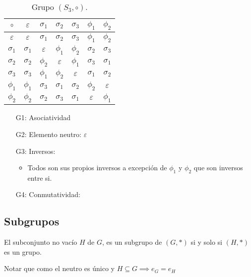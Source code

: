 \begin{table}[H]
	\centering
	\begin{tabular}{c|cccccc}
		$\circ$ & $\varepsilon$ & $\sigma_1$ & $\sigma_2$ & $\sigma_3$ & $\phi_1$ & $\phi_2$ \\ \hline
		$\varepsilon$ & $\varepsilon$ & $\sigma_1$ & $\sigma_2$ & $\sigma_3$ & $\phi_1$ & $\phi_2$ \\
		$\sigma_1$ & $\sigma_1$ & $\varepsilon$ & $\phi_1$ & $\phi_2$ & $\sigma_2$ & $\sigma_3$ \\
		$\sigma_2$ & $\sigma_2$ & $\phi_2$ & $\varepsilon$ & $\phi_1$ & $\sigma_3$ & $\sigma_1$\\
		$\sigma_3$ & $\sigma_3$ & $\phi_1$ & $\phi_2$ & $\varepsilon$ & $\sigma_1$ & $\sigma_2$\\
		$\phi_1$ & $\phi_1$ & $\sigma_3$ & $\sigma_1$ & $\sigma_2$ & $\phi_2$ & $\varepsilon$\\
		$\phi_2$ & $\phi_2$ & $\sigma_2$ & $\sigma_3$ & $\sigma_1$ & $\varepsilon$ & $\phi_1$\\
	\end{tabular}
	\caption{Grupo $(S_3, \circ)$.}
	\label{tab:compos}
\end{table}

\begin{itemize}
	\item[G1:] Asociatividad \cmark
	\item[G2:] Elemento neutro: $\varepsilon$ \cmark
	\item[G3:] Inversos: \cmark
	\begin{itemize}
		\item Todos son sus propios inversos a excepción de $\phi_1$ y $\phi_2$ que son inversos entre si.
	\end{itemize}
	\item[G4:] Conmutatividad: \xmark
\end{itemize}

\subsection{Subgrupos} \label{sec:subgrupo}
\vspace{3mm} 
	\begin{fmd-definition}[Subgrupo]
		El subconjunto no vacío $H$ de $G$, es un subgrupo de $(G, *)$ si y solo si $(H, *)$ es un grupo.
	\end{fmd-definition}
	Notar que como el neutro es único y $H \subseteq G \implies e_G = e_H$
	
